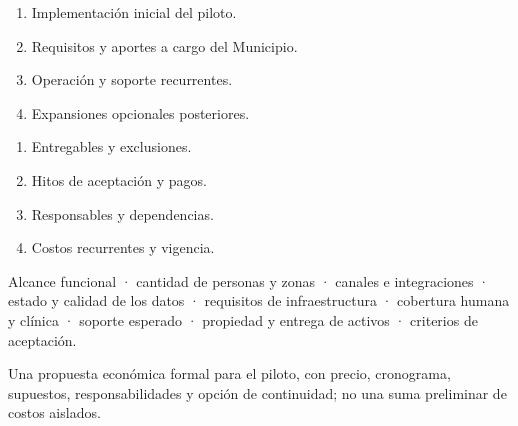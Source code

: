 \documentclass[11pt,a4paper]{article}
\begin{document}
\vspace{4mm}
\begin{minipage}[t]{.48\textwidth}
  \begin{softcard}
    \begin{enumerate}
      \item Implementación inicial del piloto.
      \item Requisitos y aportes a cargo del Municipio.
      \item Operación y soporte recurrentes.
      \item Expansiones opcionales posteriores.
    \end{enumerate}
  \end{softcard}
\end{minipage}\hfill
\begin{minipage}[t]{.48\textwidth}
  \begin{softcard}
    \begin{enumerate}
      \item Entregables y exclusiones.
      \item Hitos de aceptación y pagos.
      \item Responsables y dependencias.
      \item Costos recurrentes y vigencia.
    \end{enumerate}
  \end{softcard}
\end{minipage}

\vspace{4mm}
\begin{terracard}
  Alcance funcional · cantidad de personas y zonas · canales e integraciones · estado y calidad de los datos · requisitos de infraestructura · cobertura humana y clínica · soporte esperado · propiedad y entrega de activos · criterios de aceptación.
\end{terracard}

\vspace{8mm}
\begin{softcard}
  Una propuesta económica formal para el piloto, con precio, cronograma, supuestos, responsabilidades y opción de continuidad; no una suma preliminar de costos aislados.
\end{softcard}

\vspace{5mm}
\end{document}
